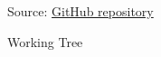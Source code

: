 \begin{figure}
  \centering
  \def\stackalignment{l} %
  {\scriptsize \parbox[t]{\linewidth}{Source: \href{https://github.com/davide-moletta/RISC-V-TE}{GitHub repository}}}
  \caption{Working Tree}
  \label{fig:workingtree}
\end{figure}

